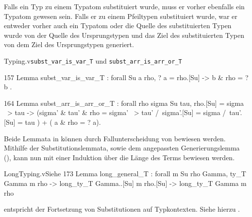 Falls ein Typ zu einem Typatom substituiert wurde, muss er vorher ebenfalls ein Typatom gewesen sein. Falls er zu einem Pfeiltypen substituiert wurde, war er entweder vorher auch ein Typatom oder die Quelle des substituierten Typen wurde von der Quelle des Ursprungstypen und das Ziel des substituierten Typen von dem Ziel des Ursprungstypen generiert.
\begin{multicode}[subst_X_is_X]{Typing.v}{}{\texttt{subst\_var\_is\_var\_T} und \texttt{subst\_arr\_is\_arr\_or\_T}}
    \begin{mcode}{157}
Lemma subst_var_is_var_T : forall Su a rho, 
    ? a = rho.[Su] -> { b & rho = ? b }.
    \end{mcode}
\begin{mcode}{164}
Lemma subst_arr_is_arr_or_T : forall rho sigma Su tau, 
    rho.[Su] = sigma ~> tau -> 
      ({sigma' & { tau' & rho = sigma' ~> tau' /\ sigma'.[Su] = sigma 
              /\ tau'.[Su] = tau } }) +
        ({ a & rho = ? a}).    
\end{mcode}    
\end{multicode}
Beide Lemmata in  können durch Fallunterscheidung von  bewiesen werden. Mithilfe der Substitutionslemmata, sowie dem angepassten Generierungslemma (), kann nun  mit einer Induktion über die Länge des Terms bewiesen werden.
\begin{code}{LongTyping.v}{Siehe }{173}
Lemma long_general_T : forall m Su rho Gamma,
    ty_T Gamma m rho -> long_ty_T Gamma..[Su] m rho.[Su] -> long_ty_T Gamma m rho
\end{code}
\begin{remark}
     entspricht der Fortsetzung von Substitutionen auf Typkontexten. Siehe hierzu .
\end{remark}
